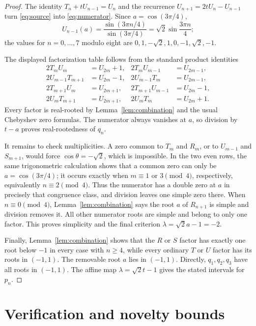 \documentclass[11pt]{article}
\newcommand{\rt}{\sqrt2}
\begin{document}
\begin{proof}
The identity $T_n+tU_{n-1}=U_n$ and the recurrence
$U_{n+1}=2tU_n-U_{n-1}$ turn \eqref{eq:source} into
\eqref{eq:numerator}.  Since $a=\cos(3\pi/4)$,
\[
 U_{n-1}(a)=\frac{\sin(3\pi n/4)}{\sin(3\pi/4)}
 =\rt\sin\frac{3\pi n}{4};
\]
the values for $n=0,\ldots,7$ modulo eight are
$0,1,-\rt,1,0,-1,\rt,-1$.

The displayed factorization table follows from the standard product
identities
\[
\begin{aligned}
2T_mU_m&=U_{2m}+1,&2T_mU_{m-1}&=U_{2m-1},\\
2U_{m-1}T_{m+1}&=U_{2m}-1,&2U_{m-1}T_m&=U_{2m-1},\\
2T_{m+1}U_m&=U_{2m+1},&2T_{m+1}U_{m-1}&=U_{2m}-1,\\
2U_mT_{m+1}&=U_{2m+1},&2U_mT_m&=U_{2m}+1.
\end{aligned}
\]
Every factor is real-rooted by Lemma~\ref{lem:combination} and the usual
Chebyshev zero formulas.  The numerator always vanishes at $a$, so division
by $t-a$ proves real-rootedness of $q_n$.

It remains to check multiplicities.  A zero common to $T_m$ and $R_m$, or to
$U_{m-1}$ and $S_{m+1}$, would force $\cos\theta=-\rt$, which is impossible.
In the two even rows, the same trigonometric calculation shows that a common
zero can only be $a=\cos(3\pi/4)$; it occurs exactly when
$m\equiv1$ or $3\pmod4$, respectively, equivalently
$n\equiv2\pmod4$.  Thus the numerator has a double zero at $a$ in precisely
that congruence class, and division leaves one simple zero there.  When
$n\equiv0\pmod4$, Lemma~\ref{lem:combination} says the root $a$ of
$R_{n+1}$ is simple and division removes it.  All other numerator roots are
simple and belong to only one factor.  This proves simplicity and the final
criterion $\lambda=\rt a-1=-2$.

Finally, Lemma~\ref{lem:combination} shows that the $R$ or $S$ factor has
exactly one root below $-1$ in every case with $n\geq4$, while every ordinary
$T$ or $U$ factor has its roots in $(-1,1)$.  The removable root $a$ lies in
$(-1,1)$.  Directly, $q_1,q_2,q_3$ have all roots in $(-1,1)$.  The affine
map $\lambda=\rt t-1$ gives the stated intervals for $p_n$.
\end{proof}

\section{Verification and novelty bounds}
\end{document}
